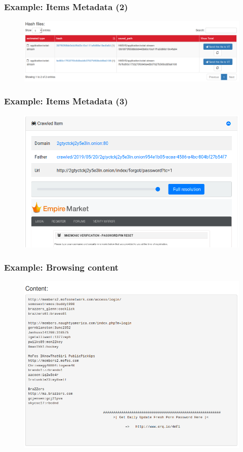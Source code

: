 \documentclass{beamer}
\begin{document}
\begin{frame}
    \frametitle{Example: Items Metadata (2)}
    \begin{figure}
        \includegraphics[scale=0.28, angle=0]{images/ail_16.png}
    \end{figure}
\end{frame}

\begin{frame}
    \frametitle{Example: Items Metadata (3)}
    \begin{figure}
        \includegraphics[scale=0.28, angle=0]{images/ail_17.png}
    \end{figure}
\end{frame}

\begin{frame}
    \frametitle{Example: Browsing content}
    \begin{figure}
        \includegraphics[scale=0.3, angle=0]{images/ail_04.png}
    \end{figure}
\end{frame}
\end{document}
